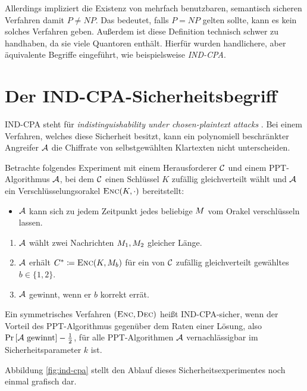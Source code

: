 Allerdings impliziert die Existenz von mehrfach benutzbaren, semantisch
sicheren Verfahren damit $P \neq NP$. Das bedeutet, falls $P = NP$
gelten sollte, kann es kein solches Verfahren geben. Außerdem ist diese
Definition technisch schwer zu handhaben, da sie viele Quantoren
enthält. Hierfür wurden handlichere, aber äquivalente Begriffe
eingeführt, wie beispielsweise \emph{IND-CPA}.

\section{Der IND-CPA-Sicherheitsbegriff}\label{sec:ind-cpa} IND-CPA
steht für \emph{indistinguishability under chosen-plaintext attacks}
\indexINDCPA. Bei einem Verfahren, welches diese Sicherheit besitzt,
kann ein polynomiell beschränkter Angreifer $\mathcal{A}$ die Chiffrate von
selbstgewählten Klartexten nicht unterscheiden.
\begin{definition} Betrachte folgendes Experiment
  mit einem Herausforderer $\mathcal{C}$ und einem PPT-Algorithmus $\mathcal{A}$, bei dem
  $\mathcal{C}$ einen Schlüssel $K$ zufällig gleichverteilt wählt und $\mathcal{A}$ ein
  Verschlüsselungsorakel $\textsc{Enc}(K,\cdot)$ bereitstellt:
  \begin{itemize}
  \item $\mathcal{A}$ kann sich zu jedem Zeitpunkt jedes beliebige
    $M$ vom Orakel verschlüsseln lassen.
  \end{itemize}
  \begin{enumerate}
  \item $\mathcal{A}$ wählt zwei Nachrichten $M_1, M_2$
    gleicher Länge.
  \item $\mathcal{A}$ erhält $C^{*} \coloneqq \textsc{Enc}(K,
    M_{b})$ für ein von $\mathcal{C}$ zufällig gleichverteilt gewähltes $b \in
    \{1, 2\}$.
  \item $\mathcal{A}$ gewinnt, wenn er $b$ korrekt errät.
  \end{enumerate} Ein symmetrisches Verfahren $(\textsc{Enc}, \textsc{Dec})$ heißt
  IND-CPA-sicher, wenn der Vorteil des PPT-Algorithmus gegenüber dem Raten
  einer Lösung, also $\Pr \left[ \mathcal{A} \textnormal{ gewinnt} \right] -
  \frac{1}{2}$, für alle PPT-Algorithmen $\mathcal{A}$ vernachlässigbar im
  Sicherheitsparameter $k$ ist.
\end{definition} Abbildung \ref{fig:ind-cpa} stellt den Ablauf dieses
Sicherheitsexperimentes noch einmal grafisch dar.

